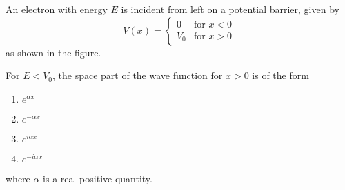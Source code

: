 \item An electron with energy $E$ is incident from left on a potential barrier, given by
\[V(x) = \begin{cases} 
    0 & \text{for } x < 0 \\
    V_0 & \text{for } x > 0
\end{cases}\]
as shown in the figure.
\begin{figure}[H]
\centering
{}
\label{fig:my_label}
\end{figure}
For $E < V_0$, the space part of the wave function for $x > 0$ is of the form
\begin{enumerate}
    \item $e^{\alpha x}$
    \item $e^{-\alpha x}$
    \item $e^{i\alpha x}$
    \item $e^{-i\alpha x}$
\end{enumerate}
where $\alpha$ is a real positive quantity.


